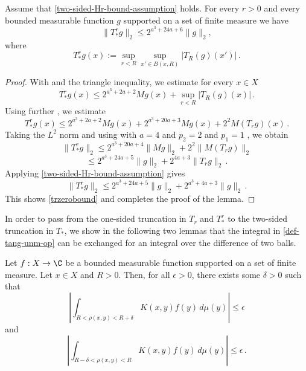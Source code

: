 \begin{lemma}\label{simple-nontangential-operator}
\leanok
{}
Assume that \eqref{two-sided-Hr-bound-assumption} holds.
For every  $r>0$ and every bounded measurable function $g$ supported on a set of finite measure we have
\begin{equation}\label{trzerobound}
    \|T_{*}^rg\|_2\le 2^{a^3+24a+6}\|g\|_2,
\end{equation}
where
\begin{equation}\label{eq-simple--nontangential}
    T_{*}^r g(x):=\sup_{r<R}\sup_{x'\in B(x,R)} |T_R(g)(x')| \, .
\end{equation}
\end{lemma}
\begin{proof}
With  and the triangle inequality, we estimate for every $x\in X$
\begin{equation}
     T_{*}^r g(x)
     \le 2^{a^3 + 2a + 2} Mg(x)+\sup_{r<R} |T_R(g)(x)|\, .
\end{equation}
Using further , we estimate
\begin{equation}
      T_{*}^r g(x)
     \le 2^{a^3+2a+2}Mg(x) + 2^{a^3+20a+3}Mg(x) + 2^{2}M(T_rg)(x)\, .
\end{equation}
Taking the $L^2$ norm and using  with $a=4$  and $p_2=2$ and $p_1=1$ , we obtain
\begin{equation}
      \|T_{*}^r g\|_2
     \le 2^{a^3+20a+4} \|Mg\|_2 + 2^{2}\|M(T_rg)\|_2
\end{equation}
\begin{equation}
     \le 2^{a^3+24a+5} \|g\|_2 + 2^{4a+3}\|T_r g\|_2\, .
\end{equation}
Applying \eqref{two-sided-Hr-bound-assumption} gives
\begin{equation}
      \|T_{*}^r g\|_2\le 2^{a^3+24a+5}\|g\|_2 + 2^{a^3+4a+3}\|g\|_2\, .
\end{equation}
This shows \eqref{trzerobound} and completes the proof of the lemma.
\end{proof}
In order to pass from the one-sided truncation in $T_r$ and $T_{*}^r$ to the two-sided truncation in $T_*$, we show in the following two lemmas that the integral in \eqref{def-tang-unm-op} can be exchanged for an integral over the difference of two balls.
\begin{lemma} \label{small-annulus}
    \leanok
    Let $f:X\to\C$ be a bounded measurable function supported on a set of finite measure.
    Let $x\in X$ and $R>0$.
    Then, for all $\epsilon>0$, there exists some $\delta>0$ such that
    \begin{equation}
        \left| \int_{R<\rho(x,y)<R+\delta} K(x,y) f(y) \, d\mu(y) \right| \le \epsilon
    \end{equation}
    and
    \begin{equation}
        \left| \int_{R-\delta<\rho(x,y)<R} K(x,y) f(y) \, d\mu(y) \right| \le \epsilon \,.
    \end{equation}
\end{lemma}
